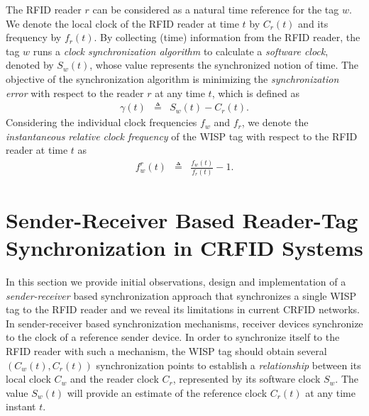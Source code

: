 \documentclass[journal,draftcls,onecolumn,12pt,twoside]{IEEEtranTCOM}
\begin{document}
The RFID reader $r$ can be considered as a natural time reference for the tag $w$. We denote the local clock of the RFID reader at time $t$ by $C_{r}(t)$ and its frequency by $f_r(t)$. By collecting (time) information from the RFID reader, the tag $w$ runs a \emph{clock synchronization algorithm} to calculate a \emph{software clock}, denoted by $S_{w}(t)$, whose value represents the synchronized notion of time. The objective of the synchronization algorithm is minimizing the \emph{synchronization error} with respect to the reader $r$ at any time $t$, which is defined as 
%
\begin{eqnarray}
\gamma(t)&\triangleq&S_w(t)-C_r(t). \label{eq:gamma_error}
\end{eqnarray}
%
Considering the individual clock frequencies $f_w$ and $f_r$, we denote the \emph{instantaneous relative clock 
frequency} of the WISP tag 
with respect to the RFID reader at time $t$ as
%
\begin{eqnarray}
f_w^r(t)&\triangleq&\frac{f_w(t)}{f_r(t)}-1. \label{eq:relative_frequency}	
\end{eqnarray}
\section{Sender-Receiver Based Reader-Tag Synchronization in CRFID Systems}
\label{sec:sender_receiver}

In this section we provide initial observations, design and implementation of a \emph{sender-receiver} based synchronization approach that synchronizes a single WISP tag to the RFID reader and we reveal its limitations in current CRFID networks. In sender-receiver based synchronization mechanisms, receiver devices synchronize to the clock of a reference sender device. In order to synchronize itself to the RFID reader with such a mechanism, the WISP tag should obtain several $(C_w(t),C_r(t))$ synchronization points to establish a \emph{relationship} between its local clock $C_w$ and the reader clock $C_r $, represented by its software clock $S_w$. The value $S_w(t)$ will provide an estimate of the reference clock $C_r(t)$ at any time instant $t$.
\end{document}
